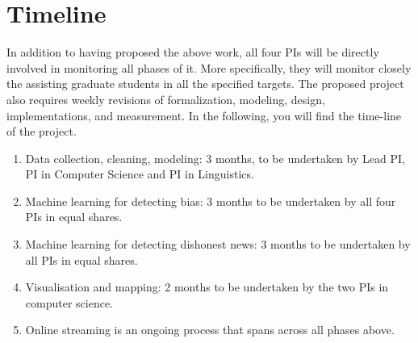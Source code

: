 \section{Timeline}
In addition to having proposed the above work, all four PIs will be directly involved in monitoring
all phases of it. More specifically, they will monitor closely the assisting graduate students in all the specified targets. The proposed project also requires weekly revisions of formalization, modeling, design, implementations, and measurement. In the following, you will find the time-line of the project. 

\begin{enumerate}
\item Data collection, cleaning, modeling:  3 months, to be undertaken by Lead PI, PI in Computer Science and PI in Linguistics.
\item Machine learning for detecting bias: 3 months to be undertaken by all four PIs in equal shares.
\item Machine learning for detecting dishonest news: 3 months to be undertaken by all PIs in equal shares.
\item Visualisation and mapping: 2 months to be undertaken by the two PIs in computer science.
\item Online streaming is an ongoing process that spans across all phases above.
\end{enumerate}
